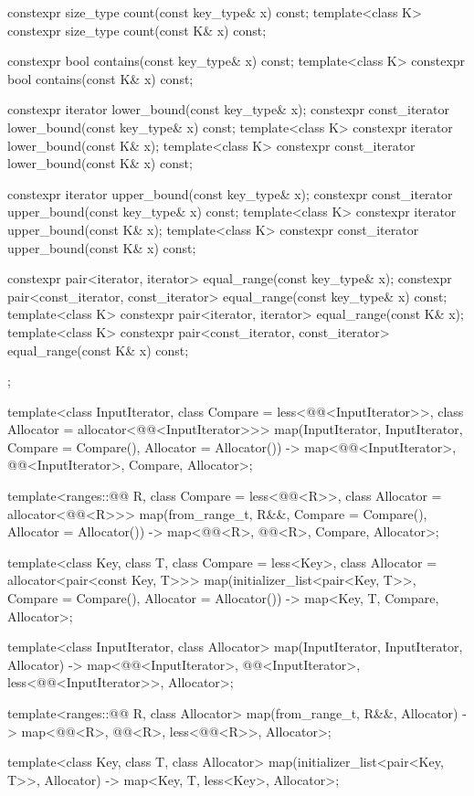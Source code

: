 \begin{codeblock}
{{    constexpr size_type      count(const key_type& x) const;
    template<class K> constexpr size_type count(const K& x) const;

    constexpr bool           contains(const key_type& x) const;
    template<class K> constexpr bool contains(const K& x) const;

    constexpr iterator       lower_bound(const key_type& x);
    constexpr const_iterator lower_bound(const key_type& x) const;
    template<class K> constexpr iterator       lower_bound(const K& x);
    template<class K> constexpr const_iterator lower_bound(const K& x) const;

    constexpr iterator       upper_bound(const key_type& x);
    constexpr const_iterator upper_bound(const key_type& x) const;
    template<class K> constexpr iterator       upper_bound(const K& x);
    template<class K> constexpr const_iterator upper_bound(const K& x) const;

    constexpr pair<iterator, iterator>               equal_range(const key_type& x);
    constexpr pair<const_iterator, const_iterator>   equal_range(const key_type& x) const;
    template<class K>
      constexpr pair<iterator, iterator>             equal_range(const K& x);
    template<class K>
      constexpr pair<const_iterator, const_iterator> equal_range(const K& x) const;
  };

  template<class InputIterator, class Compare = less<@@<InputIterator>>,
           class Allocator = allocator<@@<InputIterator>>>
    map(InputIterator, InputIterator, Compare = Compare(), Allocator = Allocator())
      -> map<@@<InputIterator>, @@<InputIterator>, Compare, Allocator>;

  template<ranges::@@ R, class Compare = less<@@<R>>,
           class Allocator = allocator<@@<R>>>
    map(from_range_t, R&&, Compare = Compare(), Allocator = Allocator())
      -> map<@@<R>, @@<R>, Compare, Allocator>;

  template<class Key, class T, class Compare = less<Key>,
           class Allocator = allocator<pair<const Key, T>>>
    map(initializer_list<pair<Key, T>>, Compare = Compare(), Allocator = Allocator())
      -> map<Key, T, Compare, Allocator>;

  template<class InputIterator, class Allocator>
    map(InputIterator, InputIterator, Allocator)
      -> map<@@<InputIterator>, @@<InputIterator>,
             less<@@<InputIterator>>, Allocator>;

  template<ranges::@@ R, class Allocator>
    map(from_range_t, R&&, Allocator)
      -> map<@@<R>, @@<R>, less<@@<R>>, Allocator>;

  template<class Key, class T, class Allocator>
    map(initializer_list<pair<Key, T>>, Allocator) -> map<Key, T, less<Key>, Allocator>;
}
\end{codeblock}


